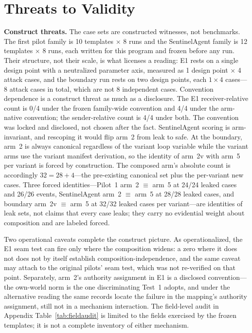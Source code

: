 \documentclass[sigconf,anonymous,nonacm]{acmart}
\newcommand{\code}[1]{\texttt{\detokenize{#1}}}
\begin{document}
\section{Threats to Validity}
\label{sec:threats}

\textbf{Construct threats.} The case sets are constructed witnesses, not benchmarks. The first pilot family is 10 templates $\times$ 8 runs and the SentinelAgent family is 12 templates $\times$ 8 runs, each written for this program and frozen before any run. Their structure, not their scale, is what licenses a reading: E1 rests on a single design point with a neutralized parameter axis, measured as 1 design point $\times$ 4 attack cases, and the boundary run rests on two design points, each $1\times4$ cases---8 attack cases in total, which are not 8 independent cases. Convention dependence is a construct threat as much as a disclosure. The E1 receiver-relative count is 0/4 under the frozen family-wide convention and 4/4 under the arm-native convention; the sender-relative count is 4/4 under both. The convention was locked and disclosed, not chosen after the fact. SentinelAgent scoring is arm-invariant, and rescoping it would flip \code{composition_history_loss} arm~2 from leak to safe. At the boundary, arm~2 is always canonical regardless of the variant loop variable while the variant arms use the variant manifest derivation, so the identity of arm~2v with arm~5 per variant is forced by construction. The composed arm's absolute count is accordingly $32=28+4$---the pre-existing canonical set plus the per-variant new cases. Three forced identities---Pilot~1 arm~2 $\equiv$ arm~5 at 24/24 leaked cases and 26/26 events, SentinelAgent arm~2 $\equiv$ arm~5 at 28/28 leaked cases, and boundary arm~2v $\equiv$ arm~5 at 32/32 leaked cases per variant---are identities of leak sets, not claims that every case leaks; they carry no evidential weight about composition and are labeled forced.

Two operational caveats complete the construct picture. As operationalized, the E1 seam test can fire only where the composition widens: a zero where it does not does not by itself establish composition-independence, and the same caveat may attach to the original pilots' seam test, which was not re-verified on that point. Separately, arm~2's authority assignment in E1 is a disclosed convention---the own-world norm is the one discriminating Test~1 adopts, and under the alternative reading the same records locate the failure in the mapping's authority assignment, still not in a mechanism interaction. The field-level audit in Appendix Table~\ref{tab:fieldaudit} is limited to the fields exercised by the frozen templates; it is not a complete inventory of either mechanism.
\end{document}
